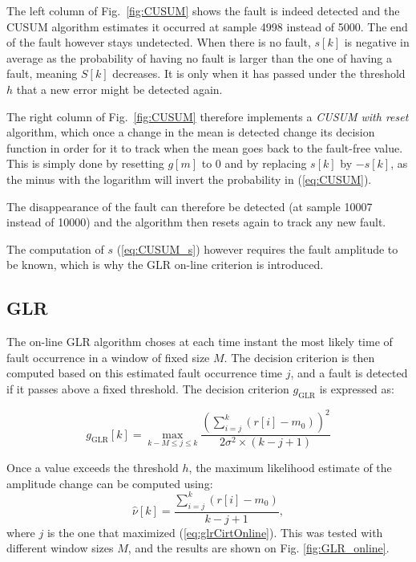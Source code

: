 \documentclass[conference]{IEEEtran}
\begin{document}
The left column of Fig.~\ref{fig:CUSUM} shows the fault is indeed detected and the CUSUM algorithm estimates it occurred at sample 4998 instead of 5000. The end of the fault however stays undetected. When there is no fault, $s[k]$ is negative in average as the probability of having no fault is larger than the one of having a fault, meaning $S[k]$ decreases. It is only when it has passed under the threshold $h$ that a new error might be detected again.

The right column of Fig.~\ref{fig:CUSUM} therefore implements a \textit{CUSUM with reset} algorithm, which once a change in the mean is detected change its decision function in order for it to track when the mean goes back to the fault-free value. This is simply done by resetting $g[m]$ to 0 and by replacing $s[k]$ by $-s[k]$, as the minus with the logarithm will invert the probability in (\ref{eq:CUSUM}).

The disappearance of the fault can therefore be detected (at sample 10007 instead of 10000) and the algorithm then resets again to track any new fault.

The computation of $s$ (\ref{eq:CUSUM_s}) however requires the fault amplitude to be known, which is why the GLR on-line criterion is introduced.

\subsection{GLR}

The on-line GLR algorithm choses at each time instant the most likely time of fault occurrence in a window of fixed size $M$. The decision criterion is then computed based on this estimated fault occurrence time $j$, and a fault is detected if it passes above a fixed threshold. The decision criterion $g_{\text{GLR}}$ is expressed as:

\begin{equation}
    g_{\text{GLR}}[k] = \max_{k-M \leq j \leq k} \frac{\left(\sum_{i=j}^{k} (r[i]-m_0)\right)^2}{2\sigma^2 \times \left(k-j+1\right)}
    \label{eq:glrCirtOnline}
\end{equation}

Once a value exceeds the threshold $h$, the maximum likelihood estimate of the amplitude change can be computed using:
\begin{equation}
    \hat{\nu}[k] = \frac{\sum_{i=j}^{k} (r[i]-m_0)}{k-j+1},
\end{equation}
where $j$ is the one that maximized (\ref{eq:glrCirtOnline}). This was tested with different window sizes $M$, and the results are shown on Fig. \ref{fig:GLR_online}.
\end{document}
